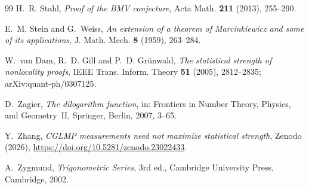 \documentclass[11pt]{amsart}
\theoremstyle{definition}
\theoremstyle{remark}
\numberwithin{equation}{section}
\begin{document}
\begin{thebibliography}{99}
H.~R. Stahl, \emph{Proof of the BMV conjecture}, Acta Math. \textbf{211} (2013), 255--290.

E.~M. Stein and G.~Weiss, \emph{An extension of a theorem of Marcinkiewicz and some of its applications}, J. Math. Mech.
\textbf{8} (1959), 263--284.

W.~van Dam, R.~D. Gill and P.~D. Gr\"unwald, \emph{The statistical strength of nonlocality proofs}, IEEE Trans. Inform.
Theory \textbf{51} (2005), 2812--2835; arXiv:quant-ph/0307125.

D.~Zagier, \emph{The dilogarithm function}, in: Frontiers in Number Theory, Physics, and Geometry~II, Springer, Berlin,
2007, 3--65.

Y.~Zhang, \emph{CGLMP measurements need not maximize statistical strength}, Zenodo (2026),
\url{https://doi.org/10.5281/zenodo.23022433}.

A.~Zygmund, \emph{Trigonometric Series}, 3rd ed., Cambridge University Press, Cambridge, 2002.

\end{thebibliography}
\end{document}
